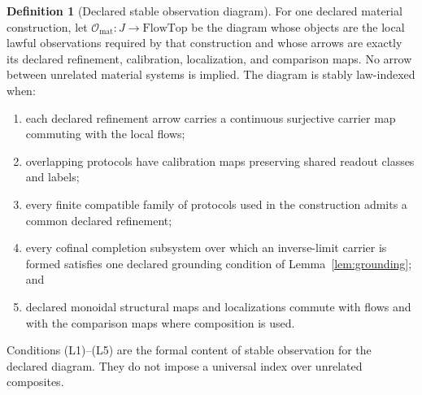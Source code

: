 \documentclass[11pt]{article}
\theoremstyle{definition}
\newtheorem{definition}{Definition}
\newcommand{\Omat}{\mathcal{O}_{\mathrm{mat}}}
\begin{document}
\begin{definition}[Declared stable observation diagram]
\label{def:stable-observation-diagram}
For one declared material construction, let $\Omat : J \to \mathrm{FlowTop}$ be the diagram whose objects are the local lawful observations required by that construction and whose arrows are exactly its declared refinement, calibration, localization, and comparison maps. No arrow between unrelated material systems is implied. The diagram is stably law-indexed when:
\begin{enumerate}[label=(L\arabic*)]
\item[(L1)] each declared refinement arrow carries a continuous surjective carrier map commuting with the local flows;
\item[(L2)] overlapping protocols have calibration maps preserving shared readout classes and labels;
\item[(L3)] every finite compatible family of protocols used in the construction admits a common declared refinement;
\item[(L4$'$)] every cofinal completion subsystem over which an inverse-limit carrier is formed satisfies one declared grounding condition of Lemma~\ref{lem:grounding}; and
\item[(L5)] declared monoidal structural maps and localizations commute with flows and with the comparison maps where composition is used.
\end{enumerate}
Conditions (L1)--(L5) are the formal content of stable observation for the declared diagram. They do not impose a universal index over unrelated composites.
\end{definition}
\end{document}
